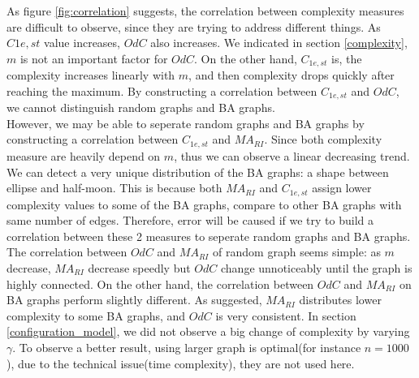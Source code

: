 \documentclass[12pt]{article}
\begin{document}
\noindent
As figure \ref{fig:correlation} suggests, the correlation between complexity measures are difficult to observe, since they are trying to address different things. As $C{1e,st}$ value increases, $OdC$ also increases. We indicated in section \ref{complexity}, $m$ is not an important factor for $OdC$. On the other hand, $C_{1e,st}$ is, the complexity increases linearly with $m$, and then complexity drops quickly after reaching the maximum. By constructing a correlation between $C_{1e,st}$ and $OdC$, we cannot distinguish random graphs and BA graphs.\\
However, we may be able to seperate random graphs and BA graphs by constructing a correlation between $C_{1e,st}$ and $MA_{RI}$. Since both complexity measure are heavily depend on $m$, thus we can observe a linear decreasing trend. We can detect a very unique distribution of the BA graphs: a shape between ellipse and half-moon. This is because both $MA_{RI}$ and $C_{1e,st}$ assign lower complexity values to some of the BA graphs, compare to other BA graphs with same number of edges. Therefore, error will be caused if we try to build a correlation between these 2 measures to seperate random graphs and BA graphs.\\
The correlation between $OdC$ and $MA_{RI}$ of random graph seems simple: as $m$ decrease, $MA_{RI}$ decrease speedly but $OdC$ change unnoticeably until the graph is highly connected. On the other hand, the correlation between $OdC$ and $MA_{RI}$ on BA graphs perform slightly different. As suggested, $MA_{RI}$ distributes lower complexity to some BA graphs, and $OdC$ is very consistent. In section \ref{configuration_model}, we did not observe a big change of complexity by varying $\gamma$. To observe a better result, using larger graph is optimal(for instance $n=1000$), due to the technical issue(time complexity), they are not used here.
\end{document}
